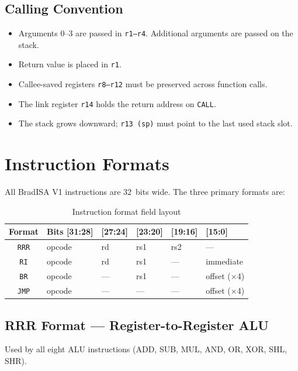 \documentclass[11pt,a4paper]{article}
\begin{document}
\subsection{Calling Convention}
\begin{itemize}[nosep]
  \item Arguments 0--3 are passed in {\tt r1--r4}. Additional arguments are
        passed on the stack.
  \item Return value is placed in {\tt r1}.
  \item Callee-saved registers {\tt r8--r12} must be preserved across function
        calls.
  \item The link register {\tt r14} holds the return address on {\tt CALL}.
  \item The stack grows downward; {\tt r13 (sp)} must point to the last used
        stack slot.
\end{itemize}

\newpage

\section{Instruction Formats}

All BradISA V1 instructions are 32~bits wide. The three primary formats are:

\begin{table}[H]
\centering
\caption{Instruction format field layout}
\begin{tabular}{clllll}
\toprule
Format  & Bits [31:28] & [27:24] & [23:20] & [19:16] & [15:0] \\
\midrule
{\tt RRR} & opcode       & rd      & rs1     & rs2     & --- \\
{\tt RI}  & opcode       & rd      & rs1     & ---     & immediate \\
{\tt BR}  & opcode       & ---     & rs1     & ---     & offset ($\times$4) \\
{\tt JMP} & opcode       & ---     & ---     & ---     & offset ($\times$4) \\
\bottomrule
\end{tabular}
\end{table}

\subsection{RRR Format --- Register-to-Register ALU}
Used by all eight ALU instructions (ADD, SUB, MUL, AND, OR, XOR, SHL, SHR).
\end{document}
